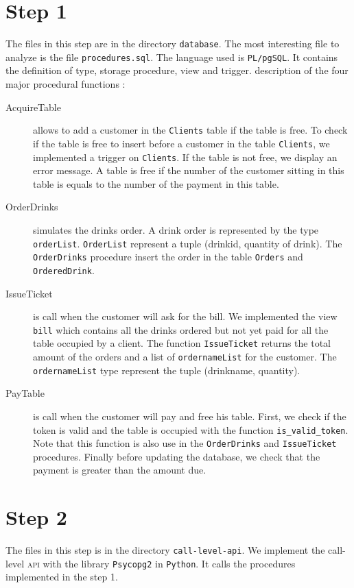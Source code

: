 \documentclass[a4paper,10pt]{article}
\begin{document}
\section*{Step 1}
The files in this step are in the directory \texttt{database}. The most interesting file to analyze is the file \texttt{procedures.sql}. The language used is \texttt{PL/pgSQL}. It contains the definition of type, storage procedure, view and trigger. description of the four major procedural functions : 
\begin{description}
\item [AcquireTable] allows to add a customer in the \texttt{Clients} table if the table is free. To check if the table is free to insert before a customer in the table \texttt{Clients}, we implemented a trigger on \texttt{Clients}. If the table is not free, we display an error message. A table is free if the number of the customer sitting in this table is equals to the number of the payment in this table.
\item[OrderDrinks] simulates the drinks order. A drink order is represented by the type \texttt{orderList}. \texttt{OrderList} represent a tuple (drinkid, quantity of drink). The \texttt{OrderDrinks} procedure insert the order in the table \texttt{Orders} and \texttt{OrderedDrink}.
\item[IssueTicket] is call when the customer will ask for the bill. We implemented the view \texttt{bill} which contains all the drinks ordered but not yet paid for all the table occupied by a client. The function \texttt{IssueTicket} returns the total amount of the orders and a list of \texttt{ordernameList} for the customer. The \texttt{ordernameList} type represent the tuple (drinkname, quantity).
\item[PayTable] is call when the customer will pay and free his table. First, we check if the token is valid and the table is occupied with the function \texttt{is\_valid\_token}.  Note that this function is also use in the \texttt{OrderDrinks} and \texttt{IssueTicket} procedures. Finally before updating the database, we check that the payment is greater than the amount due.

\end{description}

\section*{Step 2}
The files in this step is in the directory \texttt{call-level-api}.
We implement the call-level \textsc{api} with the library \texttt{Psycopg2} in \texttt{Python}. It calls the procedures implemented in the step 1. 
\end{document}
